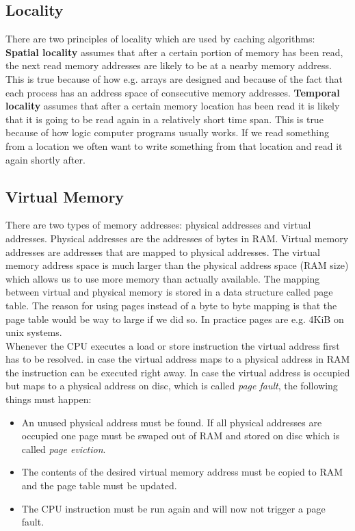 \subsection{Locality}

There are two principles of locality which are used by caching algorithms:\\
\textbf{Spatial locality} assumes that after a certain portion of memory has been read, the next read memory addresses are  likely to be at a nearby memory address. This is true because of how e.g. arrays are designed and because of the fact that each process has an address space of consecutive memory addresses.
\textbf{Temporal locality} assumes that after a certain memory location has been read it is likely that it is going to be read again in a relatively short time span. This is true because of how logic computer programs usually works. If we read something from a location we often want to write something from that location and read it again shortly after.

\subsection{Virtual Memory}

There are two types of memory addresses: physical addresses and virtual addresses. Physical addresses are the addresses of bytes in RAM. Virtual memory addresses are addresses that are mapped to physical addresses. The virtual memory address space is much larger than the physical address space (RAM size) which allows us to use more memory than actually available. The mapping between virtual and physical memory is stored in a data structure called page table. The reason for using pages instead of a byte to byte mapping is that the page table would be way to large if we did so. In practice pages are e.g. 4KiB on unix systems.\\
Whenever the CPU executes a load or store instruction the virtual address first has to be resolved. in case the virtual address maps to a physical address in RAM the instruction can be executed right away. In case the virtual address is occupied but maps to a physical address on disc, which is called \textit{page fault}, the following things must happen:

\begin{itemize}
    \item An unused physical address must be found. If all physical addresses are occupied one page must be swaped out of RAM and stored on disc which is called \textit{page eviction}.
    \item The contents of the desired virtual memory address must be copied to RAM and the page table must be updated.
    \item The CPU instruction must be run again and will now not trigger a page fault.
\end{itemize}

